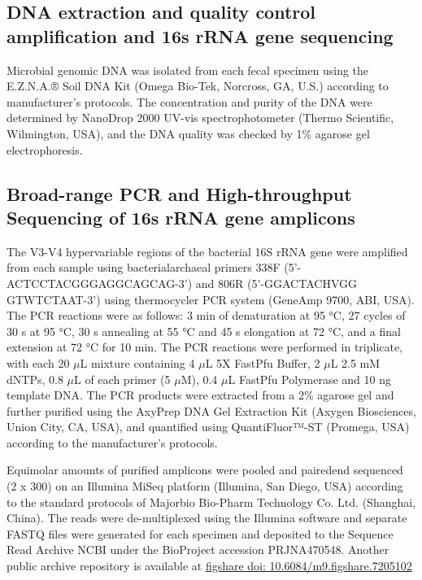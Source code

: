 \documentclass[fleqn,10pt]{wlpeerj} %
\begin{document}
  \subsection*{DNA extraction and quality control amplification and 16s rRNA gene sequencing}
  Microbial genomic DNA was isolated from each fecal specimen using the E.Z.N.A.® Soil DNA Kit (Omega Bio-Tek, Norcross, GA, U.S.) according to manufacturer’s protocols. The concentration and purity of the DNA were determined by NanoDrop 2000 UV-vis spectrophotometer (Thermo Scientific, Wilmington, USA), and the DNA quality was checked by 1\% agarose gel electrophoresis.

  \subsection*{Broad-range PCR and High-throughput Sequencing of 16s rRNA gene amplicons}
  The V3-V4 hypervariable regions of the bacterial 16S rRNA gene were amplified from each sample using bacterial\/archaeal primers 338F (5’-ACTCCTACGGGAGGCAGCAG-3’) and 806R (5’-GGACTACHVGG GTWTCTAAT-3’) using thermocycler PCR system (GeneAmp 9700, ABI, USA). The PCR reactions were as follows: 3 min of denaturation at 95 °C, 27 cycles of 30 s at 95 °C, 30 s annealing at 55 °C and 45 s elongation at 72 °C, and a final extension at 72 °C for 10 min. The PCR reactions were performed in triplicate, with each 20 $\mu$L mixture containing 4 $\mu$L 5X FastPfu Buffer, 2 $\mu$L 2.5 mM dNTPs, 0.8 $\mu$L of each primer (5 $\mu$M), 0.4 $\mu$L FastPfu Polymerase and 10 ng template DNA. The PCR products were extracted from a 2\% agarose gel and further purified using the AxyPrep DNA Gel Extraction Kit (Axygen Biosciences, Union City, CA, USA), and quantified using QuantiFluor™-ST (Promega, USA) according to the manufacturer’s protocols.

  \noindent
  Equimolar amounts of purified amplicons were pooled and paired\-end sequenced (2 x 300) on an Illumina MiSeq platform (Illumina, San Diego, USA) according to the standard protocols of Majorbio Bio-Pharm Technology Co. Ltd. (Shanghai, China). The reads were de-multiplexed using the Illumina software and separate FASTQ files were generated for each specimen and deposited to the Sequence Read Archive NCBI under the BioProject accession PRJNA470548. Another public archive repository is available at \href{https://figshare.com/articles/Untitled_Item192_samples_for_publishing_Longitudinal_gut_microbiota_patterns_in_preterm_infants_with_necrotizing_enterocolitis_or_late-onset_sepsis_an_observational_prospective_study_/7205102}{figshare doi: 10.6084/m9.figshare.7205102}
\end{document}

